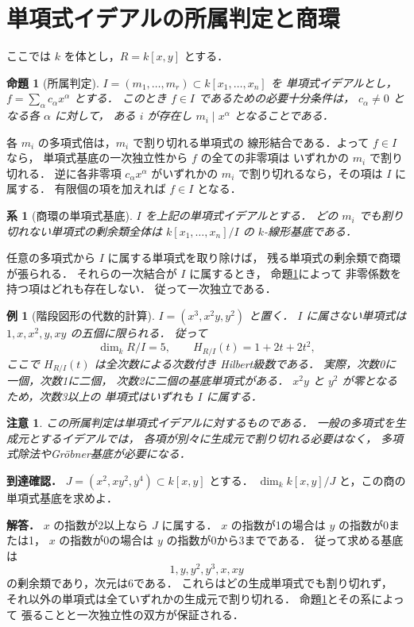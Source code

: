 \documentclass[a5paper,10pt,onecolumn]{jsarticle}
\makeatletter
\theoremstyle{mathnotetheorem}
\newtheorem{proposition}[theorem]{命題}
\newtheorem{corollary}[theorem]{系}
\newtheorem{example}[theorem]{例}
\newtheorem{remark}[theorem]{注意}
\renewcommand{\proofname}{証明}
\renewenvironment{proof}[1][\proofname]{%
  \par\pushQED{\qed}\normalfont\topsep4\p@\@plus2\p@\relax
  \trivlist\item[\hskip\labelsep\bfseries #1]\ignorespaces
}{\popQED\endtrivlist\@endpefalse}
\makeatother
\begin{document}
\section{単項式イデアルの所属判定と商環}
ここでは $k$ を体とし，$R=k[x,y]$ とする．
\begin{proposition}[所属判定]\label{prop:monomial-membership}
$I=(m_1,\ldots,m_r)\subset k[x_1,\ldots,x_n]$ を
単項式イデアルとし，
$f=\sum_\alpha c_\alpha x^\alpha$ とする．
このとき $f\in I$ であるための必要十分条件は，
$c_\alpha\ne0$ となる各 $\alpha$ に対して，
ある $i$ が存在し $m_i\mid x^\alpha$ となることである．
\end{proposition}
\begin{proof}
各 $m_i$ の多項式倍は，$m_i$ で割り切れる単項式の
線形結合である．よって $f\in I$ なら，
単項式基底の一次独立性から $f$ の全ての非零項は
いずれかの $m_i$ で割り切れる．
逆に各非零項 $c_\alpha x^\alpha$ がいずれかの
$m_i$ で割り切れるなら，その項は $I$ に属する．
有限個の項を加えれば $f\in I$ となる．
\end{proof}
\begin{corollary}[商環の単項式基底]
$I$ を上記の単項式イデアルとする．
どの $m_i$ でも割り切れない単項式の剰余類全体は
$k[x_1,\ldots,x_n]/I$ の $k$-線形基底である．
\end{corollary}
\begin{proof}
任意の多項式から $I$ に属する単項式を取り除けば，
残る単項式の剰余類で商環が張られる．
それらの一次結合が $I$ に属するとき，
命題\ref{prop:monomial-membership}によって
非零係数を持つ項はどれも存在しない．
従って一次独立である．
\end{proof}
\begin{example}[階段図形の代数的計算]
$I=(x^3,x^2y,y^2)$ と置く．
$I$ に属さない単項式は
$1,x,x^2,y,xy$ の五個に限られる．
従って
\[
 \dim_k R/I=5,\qquad
 H_{R/I}(t)=1+2t+2t^2,
\]
ここで $H_{R/I}(t)$ は全次数による次数付き
Hilbert級数である．
実際，次数0に一個，次数1に二個，
次数2に二個の基底単項式がある．
$x^2y$ と $y^2$ が零となるため，次数3以上の
単項式はいずれも $I$ に属する．
\end{example}
\begin{remark}
この所属判定は単項式イデアルに対するものである．
一般の多項式を生成元とするイデアルでは，
各項が別々に生成元で割り切れる必要はなく，
多項式除法やGr\"obner基底が必要になる．
\end{remark}
\noindent\textbf{到達確認．}
$J=(x^2,xy^2,y^4)\subset k[x,y]$ とする．
$\dim_k k[x,y]/J$ と，この商の単項式基底を求めよ．

\par\noindent\textbf{解答．}
$x$ の指数が2以上なら $J$ に属する．
$x$ の指数が1の場合は $y$ の指数が0または1，
$x$ の指数が0の場合は $y$ の指数が0から3までである．
従って求める基底は
\[
 1,y,y^2,y^3,x,xy
\]
の剰余類であり，次元は6である．
これらはどの生成単項式でも割り切れず，
それ以外の単項式は全ていずれかの生成元で割り切れる．
命題\ref{prop:monomial-membership}とその系によって
張ることと一次独立性の双方が保証される．
\end{document}
